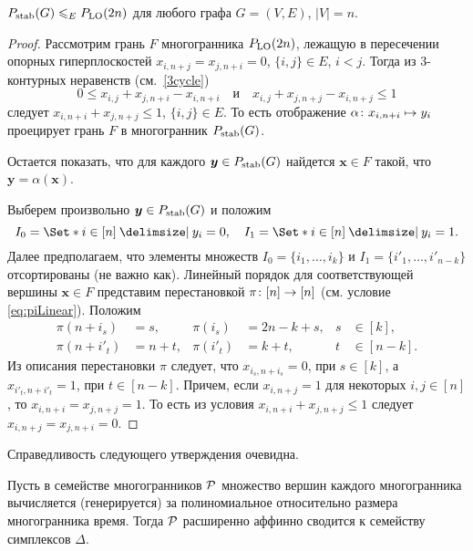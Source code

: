 \begin{lemma}
	$P_{\textup{stab}}(G) \leqslant_E P_{\textup{LO}}(2n)$ для любого графа $G = (V,E)$, $|V|=n$.
\end{lemma}
\begin{proof}
	Рассмотрим грань $F$ многогранника $P_{\textup{LO}}(2n)$, лежащую в пересечении опорных гиперплоскостей $x_{i, n+j} = x_{j, n+i} = 0$, $\{i,j\} \in E$, $i < j$.
	Тогда из 3-контурных неравенств (см.~\eqref{3cycle})
	\[
	0 \le x_{i, j} + x_{j, n+i} - x_{i, n+i} \quad \text{и} \quad
	x_{i, j} + x_{j, n+j} - x_{i, n+j} \le 1
	\]
	следует $x_{i, n+i} + x_{j, n+j} \le 1$, $\{i,j\} \in E$.
	То есть отображение $\alpha\colon x_{i, n+i} \mapsto y_i$ проецирует грань $F$ в многогранник $P_{\textup{stab}}(G)$.
	
	Остается показать, что для каждого $\bm{y} \in P_{\textup{stab}}(G)$ найдется $\bm{x} \in F$ такой, что $\bm{y} = \alpha(\bm{x})$.
	
	Выберем произвольно $\bm{y} \in P_{\textup{stab}}(G)$ и положим
	\[
	I_0 = \Set*{i \in [n] \given y_i = 0}, \quad I_1 = \Set*{i \in [n] \given y_i = 1}.
	\]
	Далее предполагаем, что элементы множеств $I_0 = \{i_1, \dots, i_k\}$ и $I_1 = \{i'_1, \dots, i'_{n-k}\}$ отсортированы (не важно как).
	Линейный порядок для соответствующей вершины $\bm{x} \in F$ представим перестановкой $\pi \colon [n] \to [n]$ (см. условие \eqref{eq:piLinear}).
	Положим
	\begin{align*}
	\pi(n+i_s) &= s, &
	\pi(i_s) &= 2n-k + s, & s &\in [k],\\
	\pi(n+i'_t) &= n + t, &
	\pi(i'_t) &= k + t, & t &\in [n-k].
	\end{align*}
	Из описания перестановки $\pi$ следует, что 
	$x_{i_s, n+i_s} = 0$,  при $s \in [k]$, а
	$x_{i'_t, n+i'_t} = 1$, при $t \in [n-k]$.
	Причем, если $x_{i, n+j} = 1$ для некоторых $i,j \in [n]$, то $x_{i, n+i} = x_{j, n+j} = 1$.
	То есть из условия $x_{i, n+i} + x_{j, n+j} \le 1$ следует $x_{i, n+j} = x_{j, n+i} = 0$.
\end{proof}

Справедливость следующего утверждения очевидна.

\begin{lemma}
Пусть в семействе многогранников ${\mathcal P}$ множество вершин каждого многогранника вычисляется (генерируется) за полиномиальное относительно размера многогранника время.
Тогда ${\mathcal P}$ расширенно аффинно сводится к семейству симплексов $\Delta$. %
\end{lemma}

